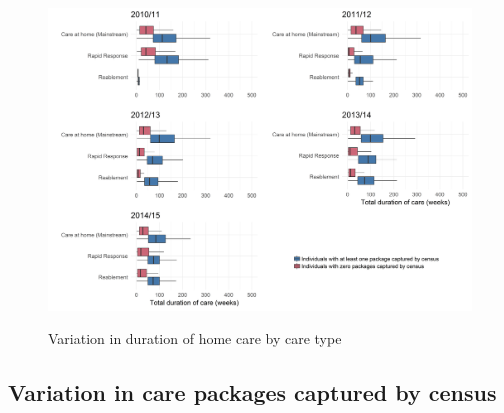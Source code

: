 \documentclass[]{article}
\begin{document}
\begin{figure}[]
  \centering
    \caption{Variation in duration of home care by care type}
    \includegraphics{figures/chapter-renf/19-dur-type-plot.png}
    \label{fig:renf-dur-type}
\end{figure}

\FloatBarrier
\subsection{Variation in care packages captured by census}\label{subsec:renf-census-variation}
\end{document}
